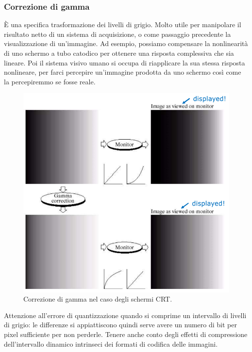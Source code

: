 \documentclass[a4paper,11pt]{article}
\begin{document}
\subsubsection{Correzione di gamma}
È una specifica trasformazione dei livelli di grigio. Molto utile per manipolare il risultato netto di un sistema di acquisizione, o come passaggio precedente la
visualizzazione di un'immagine. Ad esempio, possiamo compensare la nonlinearità di uno schermo a tubo catodico per ottenere una risposta complessiva
che sia lineare. Poi il sistema visivo umano si occupa di riapplicare la sua stessa risposta nonlineare, per farci percepire un'immagine prodotta da uno schermo così come
la percepiremmo se fosse reale.

\renewcommand{\thefigure}{5.9}
\begin{figure}[!h]
  \centering
    \includegraphics[scale=0.45]{images/5/gamma_correction_crt.png}
    \caption{Correzione di gamma nel caso degli schermi CRT.}
\end{figure}

Attenzione all'errore di quantizzazione quando si comprime un intervallo di livelli di grigio: le differenze si appiattiscono quindi serve avere
un numero di bit per pixel sufficiente per non perderle. Tenere anche conto degli effetti di compressione dell'intervallo dinamico intrinseci dei formati di codifica delle immagini.
\par
\end{document}
